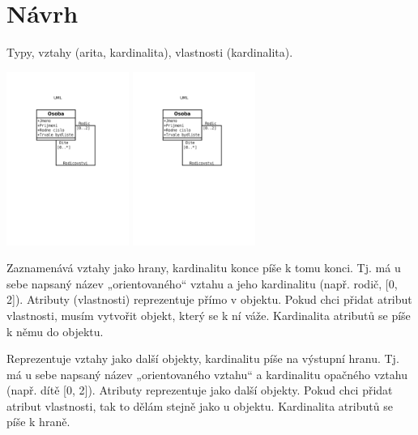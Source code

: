 \documentclass[12pt]{article}					%
\begin{document}
\section{Návrh}
\begin{poznamka}[Co je potřeba]
	Typy, vztahy (arita, kardinalita), vlastnosti (kardinalita).
\end{poznamka}

\begin{center}
	\includegraphics[width=0.3\textwidth]{UMLvsER.pdf}
	\includegraphics[width=0.3\textwidth, page=2]{UMLvsER.pdf}
\end{center}

\begin{definice}[UML]
	Zaznamenává vztahy jako hrany, kardinalitu konce píše k tomu konci. Tj. má u sebe napsaný název „orientovaného“ vztahu a jeho kardinalitu (např. rodič, [0, 2]). Atributy (vlastnosti) reprezentuje přímo v objektu. Pokud chci přidat atribut vlastnosti, musím vytvořit objekt, který se k ní váže. Kardinalita atributů se píše k němu do objektu.
\end{definice}

\begin{definice}[ER]
	Reprezentuje vztahy jako další objekty, kardinalitu píše na výstupní hranu. Tj. má u sebe napsaný název „orientovaného vztahu“ a kardinalitu opačného vztahu (např. dítě [0, 2]). Atributy reprezentuje jako další objekty. Pokud chci přidat atribut vlastnosti, tak to dělám stejně jako u objektu. Kardinalita atributů se píše k hraně.
\end{definice}
\end{document}
